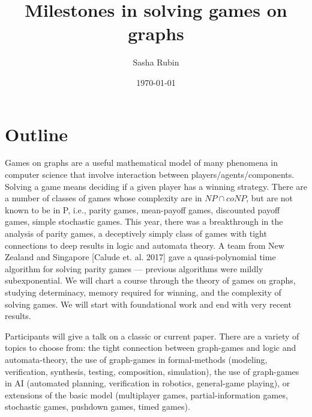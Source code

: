 \documentclass[a4paper,10pt]{article}
\title{Milestones in solving games on graphs}
\author{Sasha Rubin}
\date{\today}
\begin{document}
\maketitle


\section{Outline}

Games on graphs are a useful mathematical model of many phenomena in
computer science that involve interaction between
players/agents/components.  Solving a game means deciding if a given
player has a winning strategy. There are a number of classes of games
whose complexity are in $NP \cap coNP$, but are not known to be in P,
i.e., parity games, mean-payoff games, discounted payoff games, simple
stochastic games. This year, there was a breakthrough in the analysis
of parity games, a deceptively simply class of games with tight
connections to deep results in logic and automata theory. A team from
New Zealand and Singapore [Calude et. al. 2017] gave a
quasi-polynomial time algorithm for solving parity games --- previous
algorithms were mildly subexponential.  We will chart a course through
the theory of games on graphs, studying determinacy, memory required
for winning, and the complexity of solving games. We will start with
foundational work and end with very recent results.

Participants will give a talk on a classic or current paper. There are
a variety of topics to choose from: the tight connection between
graph-games and logic and automata-theory, the use of graph-games in
formal-methods (modeling, verification, synthesis, testing,
composition, simulation), the use of graph-games in AI (automated
planning, verification in robotics, general-game playing), or
extensions of the basic model (multiplayer games, partial-information
games, stochastic games, pushdown games, timed games).
\end{document}
